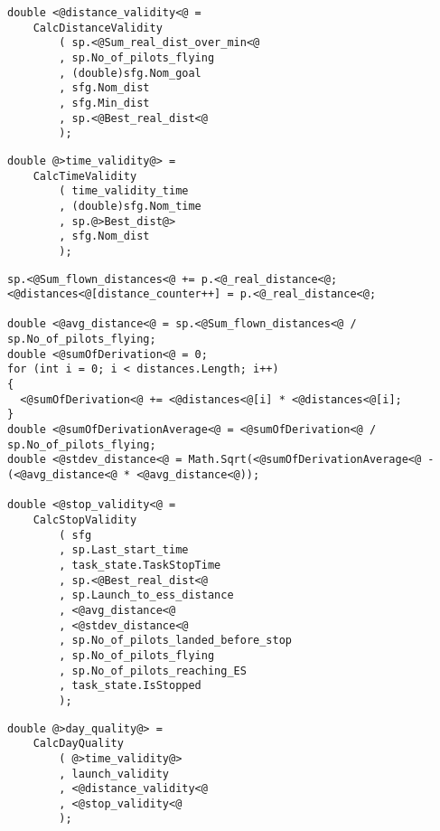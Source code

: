 \documentclass[gap.tex]{subfiles}
\begin{document}
\begin{lstlisting}[style=base, caption={Distance validity depends on \textcolor{blue}{real} distance inputs.}]
double <@distance_validity<@ =
    CalcDistanceValidity
        ( sp.<@Sum_real_dist_over_min<@
        , sp.No_of_pilots_flying
        , (double)sfg.Nom_goal
        , sfg.Nom_dist
        , sfg.Min_dist
        , sp.<@Best_real_dist<@
        );
\end{lstlisting}

\begin{lstlisting}[style=base, caption={Time validity depends on \textcolor{red}{bonus} distance input.}]
double @>time_validity@> =
    CalcTimeValidity
        ( time_validity_time
        , (double)sfg.Nom_time
        , sp.@>Best_dist@>
        , sfg.Nom_dist
        );
\end{lstlisting}

\begin{lstlisting}[style=base, caption={Stop validity depends on \textcolor{blue}{real} distance inputs.}]
sp.<@Sum_flown_distances<@ += p.<@_real_distance<@;
<@distances<@[distance_counter++] = p.<@_real_distance<@;

double <@avg_distance<@ = sp.<@Sum_flown_distances<@ / sp.No_of_pilots_flying;
double <@sumOfDerivation<@ = 0;
for (int i = 0; i < distances.Length; i++)
{
  <@sumOfDerivation<@ += <@distances<@[i] * <@distances<@[i];
}
double <@sumOfDerivationAverage<@ = <@sumOfDerivation<@ / sp.No_of_pilots_flying;
double <@stdev_distance<@ = Math.Sqrt(<@sumOfDerivationAverage<@ - (<@avg_distance<@ * <@avg_distance<@));

double <@stop_validity<@ =
    CalcStopValidity
        ( sfg
        , sp.Last_start_time
        , task_state.TaskStopTime
        , sp.<@Best_real_dist<@
        , sp.Launch_to_ess_distance
        , <@avg_distance<@
        , <@stdev_distance<@
        , sp.No_of_pilots_landed_before_stop
        , sp.No_of_pilots_flying
        , sp.No_of_pilots_reaching_ES
        , task_state.IsStopped
        );
\end{lstlisting}

\begin{lstlisting}[style=base, caption={Task validity depends on \textcolor{red}{bonus} distance.}]
double @>day_quality@> =
    CalcDayQuality
        ( @>time_validity@>
        , launch_validity
        , <@distance_validity<@
        , <@stop_validity<@
        );
\end{lstlisting}

\pagebreak
\end{document}
